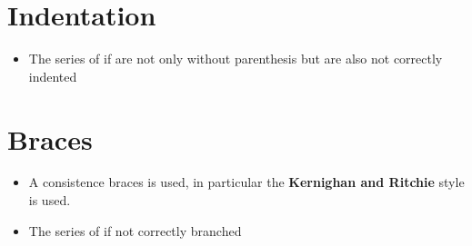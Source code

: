 \section{Indentation}
  \begin{itemize}
      \begin{itemize}
        \item The series of if are not only without parenthesis but are also not correctly indented
      \end{itemize}
  \end{itemize}
\section{Braces}
\begin{itemize}
    \begin{itemize}
      \item A consistence braces is used, in particular the \textbf{Kernighan and Ritchie} style is used.
    \end{itemize}
    \begin{itemize}
      \item The series of if not correctly branched
    \end{itemize}
\end{itemize}
